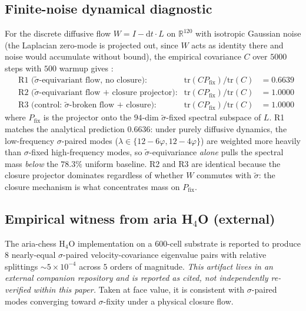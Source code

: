 \documentclass[11pt, a4paper]{amsart}
\theoremstyle{definition}
\newcommand{\R}{\mathbb{R}}
\begin{document}
\subsection{Finite-noise dynamical diagnostic}

For the discrete diffusive flow $W = I - \mathrm{d}t \cdot L$ on
$\R^{120}$ with isotropic Gaussian noise (the Laplacian zero-mode
is projected out, since $W$ acts as identity there and noise would
accumulate without bound), the empirical covariance $C$ over
$5000$ steps with $500$ warmup gives
\cite{CascadeAttractorDynamics}:
\begin{align*}
&\text{R1 ($\widetilde\sigma$-equivariant flow, no closure):}
  &\mathrm{tr}(C P_{\mathrm{fix}})/\mathrm{tr}(C) &= 0.6639 \\
&\text{R2 ($\widetilde\sigma$-equivariant flow + closure projector):}
  &\mathrm{tr}(C P_{\mathrm{fix}})/\mathrm{tr}(C) &= 1.0000 \\
&\text{R3 (control: $\widetilde\sigma$-broken flow + closure):}
  &\mathrm{tr}(C P_{\mathrm{fix}})/\mathrm{tr}(C) &= 1.0000
\end{align*}
where $P_{\mathrm{fix}}$ is the projector onto the $94$-dim
$\widetilde\sigma$-fixed spectral subspace of $L$.  R1 matches
the analytical prediction $0.6636$: under purely diffusive
dynamics, the low-frequency $\sigma$-paired modes
($\lambda \in \{12-6\varphi, 12-4\varphi\}$) are weighted more
heavily than $\sigma$-fixed high-frequency modes, so
$\widetilde\sigma$-equivariance \emph{alone} pulls the spectral
mass \emph{below} the $78.3\%$ uniform baseline.  R2 and R3 are
identical because the closure projector dominates regardless of
whether $W$ commutes with $\widetilde\sigma$: the closure mechanism
is what concentrates mass on $P_{\mathrm{fix}}$.

\subsection{Empirical witness from aria H$_4$O (external)}

The aria-chess H$_4$O implementation \cite{ariaH4Olaw} on a
600-cell substrate is reported to produce $8$ nearly-equal
$\sigma$-paired velocity-covariance eigenvalue pairs with relative
splittings $\sim 5 \times 10^{-4}$ across $5$ orders of magnitude.
\emph{This artifact lives in an external companion repository and
is reported as cited, not independently re-verified within this
paper.}  Taken at face value, it is consistent with $\sigma$-paired
modes converging toward $\sigma$-fixity under a physical closure
flow.
\end{document}
